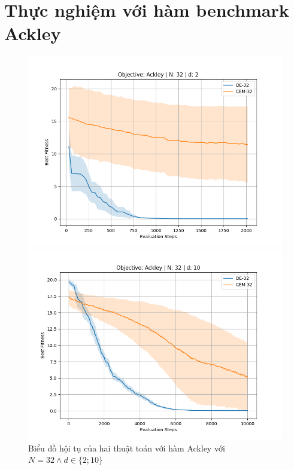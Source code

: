 \documentclass[10pt]{report}
\begin{document}
\section{Thực nghiệm với hàm benchmark Ackley}
\begin{figure}[H]\centering
	\caption{Biểu đồ hội tụ của hai thuật toán với hàm Ackley với \(N = 32 \wedge d \in \{2; 10\}\)}
	\begin{minipage}{0.45\textwidth}\centering
		\includegraphics[width=\textwidth]{../assets/graphs/objective=Ackley_N=32_d=2.png}
	\end{minipage}
	\begin{minipage}{0.45\textwidth}\centering
		\includegraphics[width=\textwidth]{../assets/graphs/objective=Ackley_N=32_d=10.png}
	\end{minipage}
\end{figure}
\end{document}
